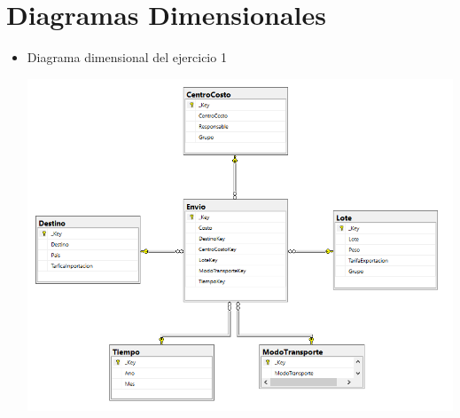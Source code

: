 \section{Diagramas Dimensionales} 

\begin{itemize}
	\item Diagrama dimensional del ejercicio 1
	\\
	\begin{center}
	\includegraphics[width=13cm]{./Imagenes/md_ejer1} 
	\end{center}



\end{itemize} 